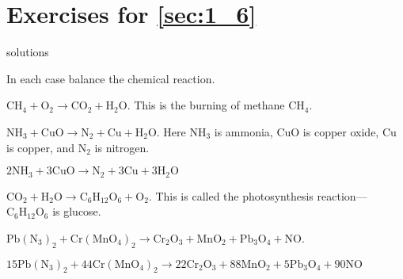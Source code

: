 \section*{Exercises for \ref{sec:1_6}}

\begin{Filesave}{solutions}
\end{Filesave}

\noindent In each case balance the chemical reaction.
\begin{multicols}{2}
\begin{ex}
$\mbox{CH}_{4} + \mbox{O}_2 \to \mbox{CO}_{2} + \mbox{H}_{2}\mbox{O}$. This is the burning of methane $\mbox{CH}_{4}$. 
\end{ex}

\begin{ex}
$\mbox{NH}_{3} + \mbox{CuO} \to \mbox{N}_{2} + \mbox{Cu} + \mbox{H}_{2}\mbox{O}$. Here $\mbox{NH}_{3}$ is ammonia, $\mbox{CuO}$ is copper oxide, $\mbox{Cu}$ is copper, and $\mbox{N}_{2}$ is nitrogen.

\begin{sol}
$2\mbox{NH}_{3} + 3\mbox{CuO} \rightarrow \mbox{N}_{2} + 3\mbox{Cu} + 3\mbox{H}_{2}\mbox{O}$
\end{sol}
\end{ex}



\begin{ex}
$\mbox{CO}_{2} + \mbox{H}_{2}\mbox{O} \to \mbox{C}_{6}\mbox{H}_{12}\mbox{O}_{6} + \mbox{O}_{2}$. This is called the photosynthesis reaction---$\mbox{C}_{6}\mbox{H}_{12}\mbox{O}_{6}$ is glucose.
\end{ex}

\begin{ex}
$\mbox{Pb}(\mbox{N}_{3})_{2} + \mbox{Cr}(\mbox{MnO}_{4})_{2} \to \mbox{Cr}_{2}\mbox{O}_{3} + \mbox{MnO}_{2} + \mbox{Pb}_{3}\mbox{O}_{4} + \mbox{NO}$.

\begin{sol}
$15\mbox{Pb}(\mbox{N}_{3})_{2} + 44\mbox{Cr}(\mbox{MnO}_{4})_{2}  \rightarrow
 22\mbox{Cr}_{2}\mbox{O}_{3} + 88\mbox{MnO}_{2} + 5\mbox{Pb}_{3}\mbox{O}_{4} + 90\mbox{NO}$
\end{sol}
\end{ex}
\end{multicols}
